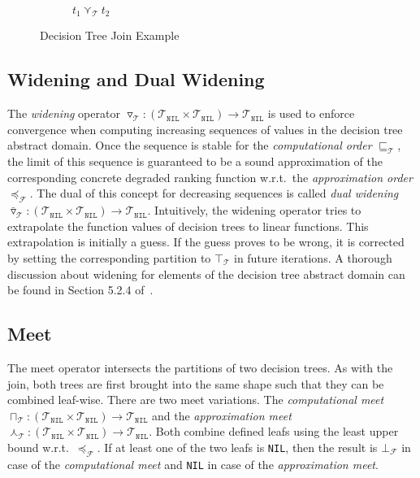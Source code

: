 \documentclass[11pt,a4paper,titlepage]{article}
\theoremstyle{definition}
\begin{document}
\begin{figure}
\begin{subfigure}[b]{0.5\textwidth}
        \caption{$t_1 \curlyvee_{\mathcal{T}} t_2$}
    \end{subfigure}

    \caption{Decision Tree Join Example}
    \label{fig:decision_tree_join_example}
\end{figure}

\subsection{Widening and Dual Widening}\label{sec:tree_widen}
The \textit{widening} operator $\triangledown_\mathcal{T} \colon (\mathcal{T}_\mathtt{NIL} \times \mathcal{T}_\mathtt{NIL}) \rightarrow \mathcal{T}_\mathtt{NIL}$
is used to enforce convergence when computing increasing sequences of values in the decision tree abstract domain. 
Once the sequence is stable for the \textit{computational order} $\sqsubseteq_\mathcal{T}$, 
the limit of this sequence is guaranteed to be a sound approximation of the corresponding concrete degraded ranking function 
w.r.t.\ the \textit{approximation order} $\preceq_{\mathcal{F}}$.
The dual of this concept for decreasing sequences is called \textit{dual widening} 
$\bar\triangledown_\mathcal{T} \colon (\mathcal{T}_\mathtt{NIL} \times \mathcal{T}_\mathtt{NIL}) \rightarrow \mathcal{T}_\mathtt{NIL}$.
Intuitively, the widening operator tries to extrapolate the function values of decision trees to linear functions. This extrapolation is
initially a guess. If the guess proves to be wrong, it is corrected by setting the corresponding partition to $\top_\mathcal{T}$ in future iterations.
A thorough discussion about widening for elements of the decision tree abstract domain can be found in Section 5.2.4 of~\cite{UrbanPhd}.


\subsection{Meet}\label{sec:tree_meet}
The meet operator intersects the partitions of two decision trees. As with the join, both trees are first
brought into the same shape such that they can be combined leaf-wise. There are two meet variations. 
The \textit{computational meet} $\sqcap_\mathcal{T} \colon (\mathcal{T}_\mathtt{NIL} \times \mathcal{T}_\mathtt{NIL}) \rightarrow \mathcal{T}_\mathtt{NIL}$
and the \textit{approximation meet} $\curlywedge_\mathcal{T} \colon (\mathcal{T}_\mathtt{NIL} \times \mathcal{T}_\mathtt{NIL}) \rightarrow \mathcal{T}_\mathtt{NIL}$. 
Both combine defined leafs using the least upper bound w.r.t.\ $\preceq_{\mathcal{F}}$. 
If at least one of the two leafs is \texttt{NIL}, then the result is $\bot_\mathcal{F}$ in case of the 
\textit{computational meet} and \texttt{NIL} in case of the \textit{approximation meet}.
\end{document}
